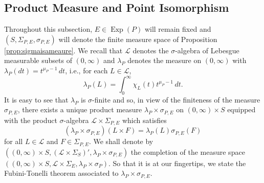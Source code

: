 \documentclass[11pt]{article}
\newcommand\Exp{\operatorname{Exp}}
\begin{document}
\subsection{Product Measure and Point Isomorphism}\label{subsec:ProductMeasure}

Throughout this subsection, $E\in\Exp(P)$ will remain fixed and $(S,\Sigma_{P,E},\sigma_{P,E})$ will denote the finite measure space of Proposition \ref{prop:sigmaisameaure}. We recall that $\mathcal{L}$ denotes the $\sigma$-algebra of Lebesgue measurable subsets of $(0,\infty)$ and  $\lambda_P$ denotes the measure on $(0,\infty)$ with $\lambda_P(dt)=t^{\mu_P-1}\,dt$, i.e., for each $L\in\mathcal{L}$,
\begin{equation*}
\lambda_P(L)=\int_0^\infty \chi_L(t)t^{\mu_P-1}\,dt.
\end{equation*}
It is easy to see that $\lambda_P$ is $\sigma$-finite and so, in view of the finiteness of the measure $\sigma_{P,E}$, there exists a unique product measure $\lambda_P\times\sigma_{P,E}$ on $(0,\infty)\times S$ equipped with the product $\sigma$-algebra $\mathcal{L}\times\Sigma_{P,E}$ which satisfies
\begin{equation*}
    (\lambda_P\times\sigma_{P,E})(L\times F)=\lambda_P(L)\sigma_{P,E}(F)
\end{equation*}
for all $L\in\mathcal{L}$ and $F\in\Sigma_{P,E}$. We shall denote by $((0,\infty)\times S,(\mathcal{L}\times\Sigma_S)',\lambda_P\times\sigma_{P,E})$ the completion of the measure space $((0,\infty)\times S,\mathcal{L}\times\Sigma_E,\lambda_P\times\sigma_P)$. So that it is at our fingertips, we state the Fubini-Tonelli theorem associated to $\lambda_P\times \sigma_{P,E}$.
\end{document}
